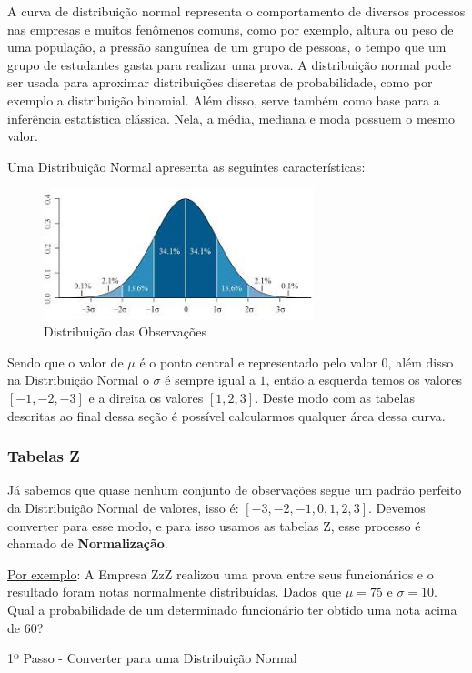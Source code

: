 \documentclass[a4paper,11pt]{article}
\begin{document}
A curva de distribuição normal representa o comportamento de diversos processos nas empresas e muitos fenômenos comuns, como por exemplo, altura ou peso de uma população, a pressão sanguínea de um grupo de pessoas, o tempo que um grupo de estudantes gasta para realizar uma prova. A distribuição normal pode ser usada para aproximar distribuições discretas de probabilidade, como por exemplo a distribuição binomial. Além disso, serve também como base para a inferência estatística clássica. Nela, a média, mediana e moda possuem o mesmo valor.

Uma Distribuição Normal apresenta as seguintes características:
\begin{figure}[H]
	\centering
	\includegraphics[width=0.70\textwidth]{imagens/sigmaDistNormal.jpeg}
	\caption{Distribuição das Observações}
\end{figure}

Sendo que o valor de $\mu$ é o ponto central e representado pelo valor $0$, além disso na Distribuição Normal o $\sigma$ é sempre igual a $1$, então a esquerda temos os valores $[-1, -2, -3]$ e a direita os valores $[1, 2, 3]$. Deste modo com as tabelas descritas ao final dessa seção é possível calcularmos qualquer área dessa curva.

\subsubsection{Tabelas Z}
Já sabemos que quase nenhum conjunto de observações segue um padrão perfeito da Distribuição Normal de valores, isso é: $[-3, -2, -1, 0, 1, 2, 3]$. Devemos converter para esse modo, e para isso usamos as tabelas Z, esse processo é chamado de \textbf{Normalização}. 

\underline{Por exemplo}: A Empresa ZzZ realizou uma prova entre seus funcionários e o resultado foram notas normalmente distribuídas. Dados que $\mu = 75$ e $\sigma = 10$. Qual a probabilidade de um determinado funcionário ter obtido uma nota acima de 60?

1º Passo - Converter para uma Distribuição Normal
\end{document}
